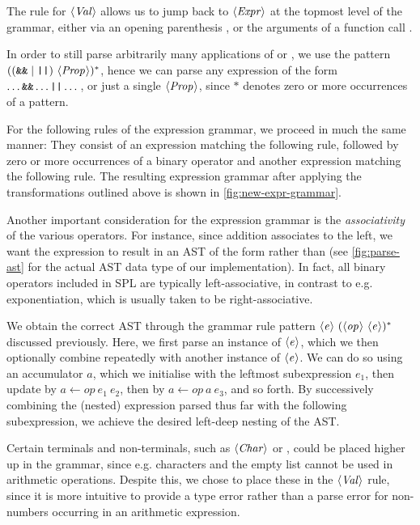 The rule for $\langle \textit{Val}\kern.7pt \rangle$ allows us to jump back to $\langle \textit{Expr}\kern.7pt \rangle$ at the topmost
level of the grammar, either via an opening parenthesis \spl{(}, or the
arguments of a function call .

In order to still parse arbitrarily many applications of \code{\&\&} or
\code{||}, we use the pattern $((\texttt{\&\&} \mid \texttt{||})\ \langle \textit{Prop}\kern.7pt \rangle)^*$,
hence we can parse any expression of the form $\dots \texttt{\&\&} \dots \texttt{||} \dots$,
or just a single $\langle \textit{Prop}\kern.7pt \rangle$, since $*$ denotes zero or more occurrences of
a pattern.

For the following rules of the expression grammar, we proceed in much the same
manner: They consist of an expression matching the following rule, followed
by zero or more occurrences of a binary operator and another expression matching
the following rule. The resulting expression grammar after applying the
transformations outlined above is shown in \cref{fig:new-expr-grammar}.


Another important consideration for the expression grammar is the
\emph{associativity} of the various operators. For instance, since addition
associates to the left, we want the expression  to result in an AST
of the form  rather than  (see
\cref{fig:parse-ast} for the actual AST data type of our implementation).
In fact, all binary operators included in SPL are typically left-associative, in
contrast to e.g. exponentiation, which is usually taken to be right-associative.

We obtain the correct AST through the grammar rule pattern
$\langle \textit{e}\kern.7pt \rangle\ (\langle \textit{op}\kern.7pt \rangle\ \langle \textit{e}\kern.7pt \rangle)^*$ discussed previously.
Here, we first parse an instance of $\langle \textit{e}\kern.7pt \rangle$, which we then optionally combine
repeatedly with another instance of $\langle \textit{e}\kern.7pt \rangle$. We can do so using an
accumulator $a$, which we initialise with the leftmost subexpression
$e_1$, then update by $a \leftarrow op\ e_1\ e_2$, then by
$a \leftarrow op\ a\ e_3$, and so forth. By successively combining the (nested)
expression parsed thus far with the following subexpression, we achieve the
desired left-deep nesting of the AST.

Certain terminals and non-terminals, such as $\langle \textit{Char}\kern.7pt \rangle$ or \code{[]}, could be
placed higher up in the grammar, since e.g. characters and the empty list cannot
be used in arithmetic operations. Despite this, we chose to place these in the
$\langle \textit{Val}\kern.7pt \rangle$ rule, since it is more intuitive to provide a type error rather than
a parse error for non-numbers occurring in an arithmetic expression.




